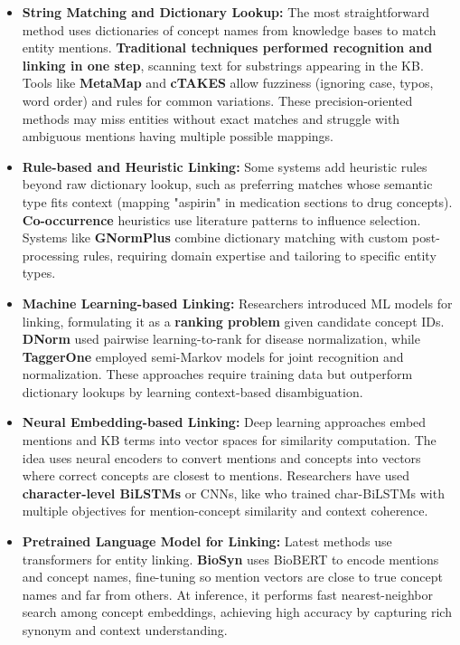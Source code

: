 \begin{itemize}
  \item \textbf{String Matching and Dictionary Lookup:} The most straightforward method uses dictionaries of concept names from knowledge bases to match entity mentions. \textbf{Traditional techniques performed recognition and linking in one step}, scanning text for substrings appearing in the KB. Tools like \textbf{MetaMap} and \textbf{cTAKES} allow fuzziness (ignoring case, typos, word order) and rules for common variations. These precision-oriented methods may miss entities without exact matches and struggle with ambiguous mentions having multiple possible mappings.

  \item \textbf{Rule-based and Heuristic Linking:} Some systems add heuristic rules beyond raw dictionary lookup, such as preferring matches whose semantic type fits context (mapping "aspirin" in medication sections to drug concepts). \textbf{Co-occurrence} heuristics use literature patterns to influence selection. Systems like \textbf{GNormPlus} combine dictionary matching with custom post-processing rules, requiring domain expertise and tailoring to specific entity types.

  \item \textbf{Machine Learning-based Linking:} Researchers introduced ML models for linking, formulating it as a \textbf{ranking problem} given candidate concept IDs. \textbf{DNorm} \parencite{Leaman2013} used pairwise learning-to-rank for disease normalization, while \textbf{TaggerOne} \parencite{Leaman2016} employed semi-Markov models for joint recognition and normalization. These approaches require training data but outperform dictionary lookups by learning context-based disambiguation.

  \item \textbf{Neural Embedding-based Linking:} Deep learning approaches embed mentions and KB terms into vector spaces for similarity computation. The idea uses neural encoders to convert mentions and concepts into vectors where correct concepts are closest to mentions. Researchers have used \textbf{character-level BiLSTMs} or CNNs, like \cite{Phan2019} who trained char-BiLSTMs with multiple objectives for mention-concept similarity and context coherence.

  \item \textbf{Pretrained Language Model for Linking:} Latest methods use transformers for entity linking. \textbf{BioSyn} \parencite{Sung2020} uses BioBERT to encode mentions and concept names, fine-tuning so mention vectors are close to true concept names and far from others. At inference, it performs fast nearest-neighbor search among concept embeddings, achieving high accuracy by capturing rich synonym and context understanding.
\end{itemize}

